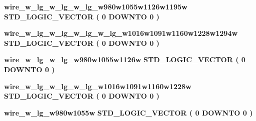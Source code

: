 \begin{DoxyCompactItemize}
\item 
{\bf wire\+\_\+w\+\_\+lg\+\_\+w\+\_\+lg\+\_\+w\+\_\+lg\+\_\+w980w1055w1126w1195w} {\bfseries \textcolor{comment}{S\+T\+D\+\_\+\+L\+O\+G\+I\+C\+\_\+\+V\+E\+C\+T\+OR}\textcolor{vhdlchar}{ }\textcolor{vhdlchar}{(}\textcolor{vhdlchar}{ }\textcolor{vhdlchar}{ } \textcolor{vhdldigit}{0} \textcolor{vhdlchar}{ }\textcolor{keywordflow}{D\+O\+W\+N\+TO}\textcolor{vhdlchar}{ }\textcolor{vhdlchar}{ } \textcolor{vhdldigit}{0} \textcolor{vhdlchar}{ }\textcolor{vhdlchar}{)}\textcolor{vhdlchar}{ }} 
\item 
{\bf wire\+\_\+w\+\_\+lg\+\_\+w\+\_\+lg\+\_\+w\+\_\+lg\+\_\+w\+\_\+lg\+\_\+w1016w1091w1160w1228w1294w} {\bfseries \textcolor{comment}{S\+T\+D\+\_\+\+L\+O\+G\+I\+C\+\_\+\+V\+E\+C\+T\+OR}\textcolor{vhdlchar}{ }\textcolor{vhdlchar}{(}\textcolor{vhdlchar}{ }\textcolor{vhdlchar}{ } \textcolor{vhdldigit}{0} \textcolor{vhdlchar}{ }\textcolor{keywordflow}{D\+O\+W\+N\+TO}\textcolor{vhdlchar}{ }\textcolor{vhdlchar}{ } \textcolor{vhdldigit}{0} \textcolor{vhdlchar}{ }\textcolor{vhdlchar}{)}\textcolor{vhdlchar}{ }} 
\item 
{\bf wire\+\_\+w\+\_\+lg\+\_\+w\+\_\+lg\+\_\+w980w1055w1126w} {\bfseries \textcolor{comment}{S\+T\+D\+\_\+\+L\+O\+G\+I\+C\+\_\+\+V\+E\+C\+T\+OR}\textcolor{vhdlchar}{ }\textcolor{vhdlchar}{(}\textcolor{vhdlchar}{ }\textcolor{vhdlchar}{ } \textcolor{vhdldigit}{0} \textcolor{vhdlchar}{ }\textcolor{keywordflow}{D\+O\+W\+N\+TO}\textcolor{vhdlchar}{ }\textcolor{vhdlchar}{ } \textcolor{vhdldigit}{0} \textcolor{vhdlchar}{ }\textcolor{vhdlchar}{)}\textcolor{vhdlchar}{ }} 
\item 
{\bf wire\+\_\+w\+\_\+lg\+\_\+w\+\_\+lg\+\_\+w\+\_\+lg\+\_\+w1016w1091w1160w1228w} {\bfseries \textcolor{comment}{S\+T\+D\+\_\+\+L\+O\+G\+I\+C\+\_\+\+V\+E\+C\+T\+OR}\textcolor{vhdlchar}{ }\textcolor{vhdlchar}{(}\textcolor{vhdlchar}{ }\textcolor{vhdlchar}{ } \textcolor{vhdldigit}{0} \textcolor{vhdlchar}{ }\textcolor{keywordflow}{D\+O\+W\+N\+TO}\textcolor{vhdlchar}{ }\textcolor{vhdlchar}{ } \textcolor{vhdldigit}{0} \textcolor{vhdlchar}{ }\textcolor{vhdlchar}{)}\textcolor{vhdlchar}{ }} 
\item 
{\bf wire\+\_\+w\+\_\+lg\+\_\+w980w1055w} {\bfseries \textcolor{comment}{S\+T\+D\+\_\+\+L\+O\+G\+I\+C\+\_\+\+V\+E\+C\+T\+OR}\textcolor{vhdlchar}{ }\textcolor{vhdlchar}{(}\textcolor{vhdlchar}{ }\textcolor{vhdlchar}{ } \textcolor{vhdldigit}{0} \textcolor{vhdlchar}{ }\textcolor{keywordflow}{D\+O\+W\+N\+TO}\textcolor{vhdlchar}{ }\textcolor{vhdlchar}{ } \textcolor{vhdldigit}{0} \textcolor{vhdlchar}{ }\textcolor{vhdlchar}{)}\textcolor{vhdlchar}{ }} 

\end{DoxyCompactItemize}

